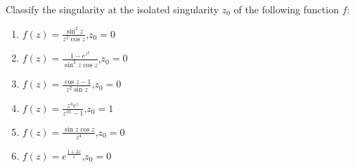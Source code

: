 \documentclass{article}
\theoremstyle{definition}
\begin{document}
	\begin{tcolorbox}[colback=white,colframe=white,arc=5pt,title={\color{black}\bf $\bullet$ Classification of Singularities I}]
		Classify the singularity at the isolated singularity $z_0$ of the following function $f$:
		\begin{enumerate}[(1)]
			\item $\displaystyle f(z)=\frac{\sin^2z}{z^2\cos z}$,\quad $z_0=0$
			\item $\displaystyle f(z)=\frac{1-e^{z^2}}{\sin^2z\cos z}$,\quad $z_0=0$
			\item $\displaystyle f(z)=\frac{\cos z-1}{z^2\sin z}$,\quad $z_0=0$
			\item $\displaystyle f(z)=\frac{z^3e^z}{z^{10}-1}$,\quad $z_0=1$
			\item $\displaystyle f(z)=\frac{\sin z\cos z}{z^4}$,\quad $z_0=0$
			\item $\displaystyle f(z)=e^{\displaystyle\frac{1+2z}{z}}$,\quad $z_0=0$
		\end{enumerate}
	\end{tcolorbox}
\end{document}
